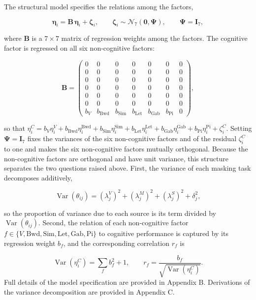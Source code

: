 \documentclass[
  ,man]{apa6}
\begin{document}
The structural model specifies the relations among the factors,

\[
\boldsymbol{\eta}_i = \mathbf{B}\,\boldsymbol{\eta}_i + \boldsymbol{\zeta}_i, \qquad
\boldsymbol{\zeta}_i \sim \mathcal{N}_{7}\!\left(\mathbf{0}, \boldsymbol{\Psi}\right), \qquad
\boldsymbol{\Psi} = \mathbf{I}_7,
\]

where \(\mathbf{B}\) is a \(7 \times 7\) matrix of regression weights among the factors. The cognitive factor is regressed on all six non-cognitive factors:

\[
\mathbf{B} =
\begin{pmatrix}
0 & 0 & 0 & 0 & 0 & 0 & 0\\
0 & 0 & 0 & 0 & 0 & 0 & 0\\
0 & 0 & 0 & 0 & 0 & 0 & 0\\
0 & 0 & 0 & 0 & 0 & 0 & 0\\
0 & 0 & 0 & 0 & 0 & 0 & 0\\
0 & 0 & 0 & 0 & 0 & 0 & 0\\
b_{V} & b_{\text{Bwd}} & b_{\text{Sim}} & b_{\text{Let}} & b_{\text{Gab}} & b_{\text{Pi}} & 0
\end{pmatrix},
\]

so that \(\eta_i^{C} = b_{V}\eta_i^{V} + b_{\text{Bwd}}\eta_i^{\text{Bwd}} + b_{\text{Sim}}\eta_i^{\text{Sim}} + b_{\text{Let}}\eta_i^{\text{Let}} + b_{\text{Gab}}\eta_i^{\text{Gab}} + b_{\text{Pi}}\eta_i^{\text{Pi}} + \zeta_i^{C}\). Setting \(\boldsymbol{\Psi} = \mathbf{I}_7\) fixes the variances of the six non-cognitive factors and of the residual \(\zeta_i^{C}\) to one and makes the six non-cognitive factors mutually orthogonal. Because the non-cognitive factors are orthogonal and have unit variance, this structure separates the two questions raised above. First, the variance of each masking task decomposes additively,

\[
\operatorname{Var}(\theta_{ij}) = \left(\lambda_j^{V}\right)^2 + \left(\lambda_j^{M}\right)^2 + \left(\lambda_j^{S}\right)^2 + \delta_j^2,
\]

so the proportion of variance due to each source is its term divided by \(\operatorname{Var}(\theta_{ij})\). Second, the relation of each non-cognitive factor \(f \in \{V, \text{Bwd}, \text{Sim}, \text{Let}, \text{Gab}, \text{Pi}\}\) to cognitive performance is captured by its regression weight \(b_f\), and the corresponding correlation \(r_f\) is

\[
\operatorname{Var}\!\left(\eta_i^{C}\right) = \sum_f b_f^2 + 1, \qquad
r_f = \frac{b_f}{\sqrt{\operatorname{Var}\!\left(\eta_i^{C}\right)}}.
\]
Full details of the model specification are provided in Appendix B. Derivations of the variance decomposition are provided in Appendix C.
\end{document}
